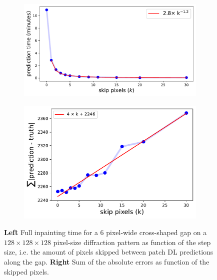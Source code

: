 \begin{figure}[H]
    \centering
    \begin{subfigure}{0.45\textwidth} %
        \centering
        \includegraphics[width=\linewidth]{figures/Inpainting/skip_pixels_time.pdf}
        \caption*{}
    \end{subfigure}
    \hfill
    \begin{subfigure}{0.45\textwidth}
        \centering
        \includegraphics[width=\linewidth]{figures/Inpainting/skip_error.pdf}
        \caption*{}
    \end{subfigure}
    \caption{\textbf{Left} Full inpainting time for a 6 pixel-wide cross-shaped gap on a  $128\times128\times128$ pixel-size
    diffraction pattern as function of the step size, i.e. the amount of pixels skipped between patch DL predictions along the gap.
    \textbf{Right} Sum of the absolute errors as function of the skipped pixels. }
    \label{fig:skip_case}
\end{figure}

